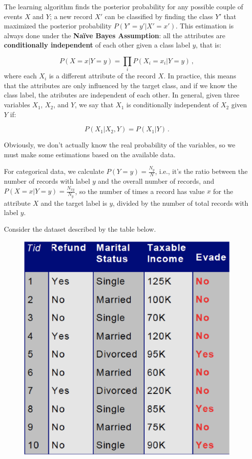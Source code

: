 The learning algorithm finds the posterior probability for any possible couple of events $X$ and $Y$; a new record $X'$ can be classified by finding the class $Y'$ that maximized the posterior probability $P(Y'=y'|X'=x')$. This estimation is always done under the \textbf{Naïve Bayes Assumption}: all the attributes are \textbf{conditionally independent} of each other given a class label $y$, that is:

\begin{equation*}
    P(X=x|Y=y) = \prod_i P(X_i = x_i|Y=y) \, ,
\end{equation*}
where each $X_i$ is a different attribute of the record $X$. In practice, this means that the attributes are only influenced by the target class, and if we know the class label, the atributes are independent of each other. In general, given three variables $X_1$, $X_2$, and $Y$, we say that $X_1$ is conditionally independent of $X_2$ given $Y$ if:

\begin{equation*}
    P(X_1 | X_2,Y) = P(X_1|Y) \, .
\end{equation*}

Obviously, we don't actually know the real probability of the variables, so we must make some estimations based on the available data.

For categorical data, we calculate $P(Y=y) = \frac{N_y}{N}$, i.e., it's the ratio between the number of records with label $y$ and the overall number of records, and $P(X=x|Y=y) = \frac{N_{xy}}{N_y}$, so the number of times a record has value $x$ for the attribute $X$ and the target label is $y$, divided by the number of total records with label $y$.

Consider the dataset described by the table below.
\begin{figure}[h]
    \centering
    \includegraphics[width=0.5\linewidth]{img/NBC.png} 
\end{figure}

